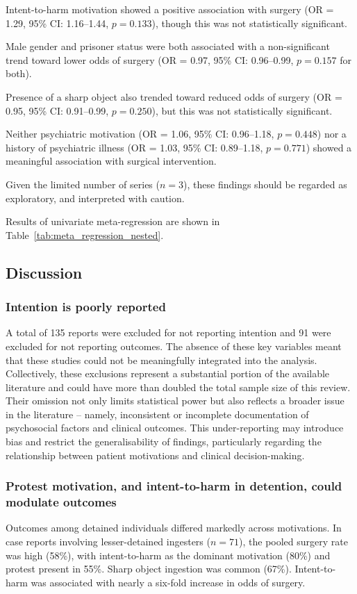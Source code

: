 \documentclass[pdflatex,sn-basic,Numbered]{sn-jnl}
\begin{document}
Intent-to-harm motivation showed a positive association with surgery (OR = 1.29, 95\% CI: 1.16--1.44, $p = 0.133$), though this was not statistically significant.

Male gender and prisoner status were both associated with a non-significant trend toward lower odds of surgery (OR = 0.97, 95\% CI: 0.96--0.99, $p = 0.157$ for both).

Presence of a sharp object also trended toward reduced odds of surgery (OR = 0.95, 95\% CI: 0.91--0.99, $p = 0.250$), but this was not statistically significant. 

Neither psychiatric motivation (OR = 1.06, 95\% CI: 0.96--1.18, $p = 0.448$) nor a history of psychiatric illness (OR = 1.03, 95\% CI: 0.89--1.18, $p = 0.771$) showed a meaningful association with surgical intervention.

Given the limited number of series ($n = 3$), these findings should be regarded as exploratory, and interpreted with caution.

Results of univariate meta-regression are shown in Table~\ref{tab:meta_regression_nested}.



\subsection{Discussion}

\subsubsection{Intention is poorly reported}
A total of 135 reports were excluded for not reporting intention and 91 were excluded for not reporting outcomes. The absence of these key variables meant that these studies could not be meaningfully integrated into the analysis. Collectively, these exclusions represent a substantial portion of the available literature and could have more than doubled the total sample size of this review. Their omission not only limits statistical power but also reflects a broader issue in the literature -- namely, inconsistent or incomplete documentation of psychosocial factors and clinical outcomes. This under-reporting may introduce bias and restrict the generalisability of findings, particularly regarding the relationship between patient motivations and clinical decision-making.

\subsubsection{Protest motivation, and intent-to-harm in detention, could modulate outcomes}
Outcomes among detained individuals differed markedly across motivations. In case reports involving lesser-detained ingesters ($n = 71$), the pooled surgery rate was high (58\%), with intent-to-harm as the dominant motivation (80\%) and protest present in 55\%. Sharp object ingestion was common (67\%). Intent-to-harm was associated with nearly a six-fold increase in odds of surgery.
\end{document}
